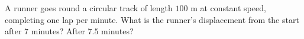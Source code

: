 A runner goes round a circular track of length $100$ m at constant speed, completing one lap per minute. What is the runner's displacement from the start after $7$ minutes? After $7.5$ minutes?
